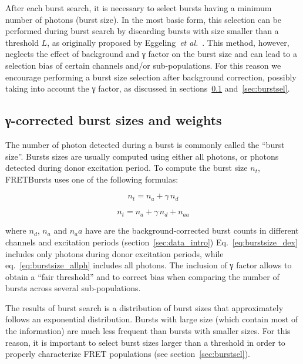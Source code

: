 After each burst search, it is necessary to select
bursts having a minimum number of photons (burst size). In the most
basic form, this selection can be performed during burst search by discarding
bursts with size smaller than a threshold $L$, as originally proposed by
Eggeling~\textit{et al.}~\cite{Eggeling_1998}.
This method, however, neglects the effect
of background and γ factor on the burst size and can lead to a selection
bias of certain channels and/or sub-populations.
For this reason we encourage performing a burst size selection after background
correction, possibly taking into account the γ factor, as discussed in
sections~\ref{sec:burstsizeweights} and~\ref{sec:burstsel}.

\subsection{γ-corrected burst sizes and weights}
\label{sec:burstsizeweights}

The number of photon detected during a burst is commonly called the ``burst size''.
Bursts sizes are usually computed using either all photons, or photons detected 
during donor excitation period. To compute the burst size $n_t$, FRETBursts uses 
one of the following formulas:

\begin{equation}
\label{eq:burstsize_dex}
n_t = n_a + \gamma\,n_d 
\end{equation}

\begin{equation}
\label{eq:burstsize_allph}
n_t = n_a + \gamma\,n_d + n_{aa}
\end{equation}

\noindent where $n_d$, $n_a$ and $n_aa$ have are the background-corrected
burst counts in different channels and excitation periods (section~\ref{sec:data_intro})
Eq.~\ref{eq:burstsize_dex} includes  only photons during donor excitation periods, 
while eq.~\ref{eq:burstsize_allph} includes all photons.
The inclusion of γ factor allows to obtain a ``fair threshold''
and to correct bias when comparing the number of bursts across several sub-populations.

The results of burst search is a distribution of burst sizes that approximately 
follows an exponential distribution.
Bursts with large size (which contain most of the information)
are much less frequent than bursts with smaller sizes. For this reason, it is 
important to select burst sizes larger than a threshold in order
to properly characterize FRET populations (see section~\ref{sec:burstsel}). 

